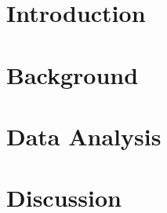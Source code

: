 \chapter{Introduction}
	
	
\chapter{Background}
	
	
	
		
\chapter{Data Analysis}

					
		
\chapter{Discussion}

	
		
		
%	

